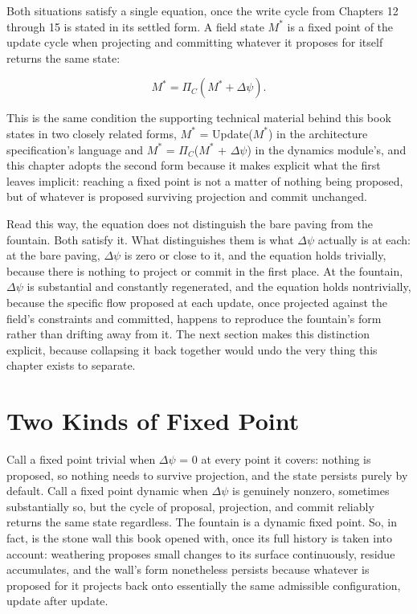 Both situations satisfy a single equation, once the write cycle from Chapters 12 through 15 is stated in its settled form. A field state \(M^*\) is a fixed point of the update cycle when projecting and committing whatever it proposes for itself returns the same state:

\[ M^* = \Pi_C(M^* + \Delta\psi). \]

This is the same condition the supporting technical material behind this book states in two closely related forms, \(M^*\) = Update(\(M^*\)) in the architecture specification's language and \(M^*\) = \(\Pi_C\)(\(M^*\) + \(\Delta\psi\)) in the dynamics module's, and this chapter adopts the second form because it makes explicit what the first leaves implicit: reaching a fixed point is not a matter of nothing being proposed, but of whatever is proposed surviving projection and commit unchanged.

Read this way, the equation does not distinguish the bare paving from the fountain. Both satisfy it. What distinguishes them is what \(\Delta\psi\) actually is at each: at the bare paving, \(\Delta\psi\) is zero or close to it, and the equation holds trivially, because there is nothing to project or commit in the first place. At the fountain, \(\Delta\psi\) is substantial and constantly regenerated, and the equation holds nontrivially, because the specific flow proposed at each update, once projected against the field's constraints and committed, happens to reproduce the fountain's form rather than drifting away from it. The next section makes this distinction explicit, because collapsing it back together would undo the very thing this chapter exists to separate.

\section{Two Kinds of Fixed Point}

Call a fixed point trivial when \(\Delta\psi\) = 0 at every point it covers: nothing is proposed, so nothing needs to survive projection, and the state persists purely by default. Call a fixed point dynamic when \(\Delta\psi\) is genuinely nonzero, sometimes substantially so, but the cycle of proposal, projection, and commit reliably returns the same state regardless. The fountain is a dynamic fixed point. So, in fact, is the stone wall this book opened with, once its full history is taken into account: weathering proposes small changes to its surface continuously, residue accumulates, and the wall's form nonetheless persists because whatever is proposed for it projects back onto essentially the same admissible configuration, update after update.

